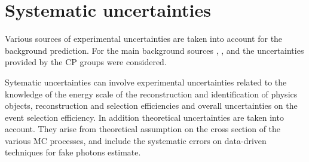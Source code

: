   
  
  
  
  

\section{Systematic uncertainties}
Various sources of experimental uncertainties are taken into account for the background prediction. For the main background sources \znng, \zg, \wg and \gj the uncertainties provided by the CP groups were considered.

Sytematic uncertainties can involve experimental uncertainties related to the knowledge of the energy scale of the reconstruction and identification of physics objects, reconstruction and selection efficiencies and overall uncertainties on the event selection efficiency. In addition theoretical uncertainties are taken into account. They arise from theoretical assumption on the cross section of the various MC processes, and include the systematic errors on data-driven techniques for fake photons estimate.

